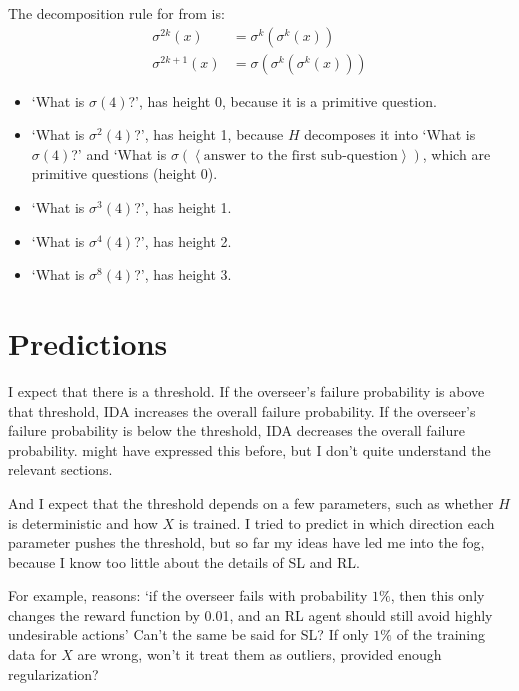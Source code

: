 \documentclass{farlamp}
\begin{document}
\begin{example}
    The decomposition rule for  from \textcite[table
    3]{CSASupAmp} is:
    \begin{align}
        \sigma^{2k}(x) &= \sigma^k(\sigma^k(x)) \\
        \sigma^{2k+1}(x) &= \sigma(\sigma^k(\sigma^k(x)))
    \end{align}

    \begin{itemize}
        \item ‘What is $\sigma(4)$?’, has height 0, because it is a primitive
            question.
        \item ‘What is $\sigma^2(4)$?’, has height 1, because $H$ decomposes it
            into ‘What is $\sigma(4)$?’ and ‘What is $\sigma(\left<\text{answer
            to the first sub-question}\right>)$, which are primitive questions
            (height 0).
        \item ‘What is $\sigma^3(4)$?’, has height 1.
        \item ‘What is $\sigma^4(4)$?’, has height 2.
        \item ‘What is $\sigma^8(4)$?’, has height 3.
    \end{itemize}
\end{example}


\section{Predictions}
\label{sec:prediction}

I expect that there is a threshold. If the overseer's failure probability is
above that threshold, IDA increases the overall failure probability. If the
overseer's failure probability is below the threshold, IDA decreases the overall
failure probability. \textcite{ChriRelAmp} might have expressed this before, but
I don't quite understand the relevant sections.

And I expect that the threshold depends on a few parameters, such as whether $H$
is deterministic and how $X$ is trained. I tried to predict in which direction
each parameter pushes the threshold, but so far my ideas have led me into the
fog, because I know too little about the details of SL and RL.

For example, \textcite{ChriRelAmp} reasons: ‘if the overseer fails with
probability $1 \%$, then this only changes the reward function by 0.01, and an
RL agent should still avoid highly undesirable actions’ Can't the same be said
for SL? If only $1 \%$ of the training data for $X$ are wrong, won't it treat
them as outliers, provided enough regularization?
\end{document}
